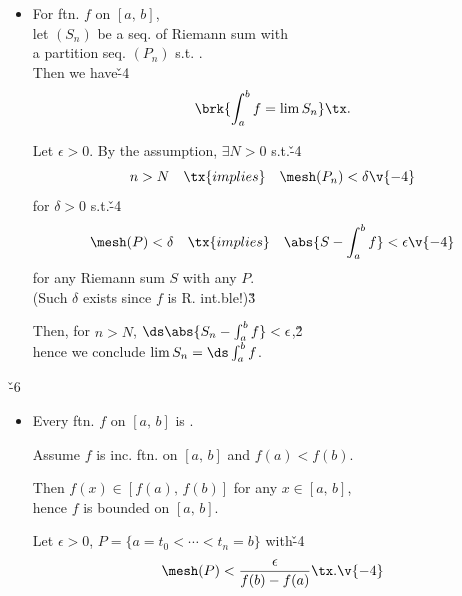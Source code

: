 \documentclass[dvipdfmx,a4paper,titlepage,9pt]{jsarticle}
\begin{document}
\begin{multicols*}{2}
\begin{itemize}[label={-}]
\begin{Pfbox}[($\Longto$)]
It follows that\v{-2}
$$\begin{aligned}
L(f)\lqs L(f,\,P)&>S-\epsilon(b-a)\\
&>r-\epsilon(b-a+1)\gqs r
\end{aligned}\v{-4}$$
since $\epsilon$ is arbitrary.

Similarly, we can show $U(f)\lqs r$.\v3

Since $L(f)\lqs U(f)$, we have $L(f)=U(f)=r$,\v2\\
hence $f$ is [D.] integrable, and $\ds\int_a^bf=\mcl R\int_a^bf$.
\end{Pfbox}\v9

\item For  ftn. $f$ on $[a,\,b]$,\\
let $(S_n)$ be a seq. of Riemann sum with\\
a partition seq. $(P_n)$ s.t. .\\
Then we have\v{-4}
$$\brk{\int_a^bf=\lim S_n}\tx.$$

\begin{Pfbox}
Let $\epsilon>0$. By the assumption, $\exists N>0$ s.t.\v{-4}
$$n>N\quad\tx{implies}\quad \mesh(P_n)<\delta\v{-4}$$
for $\delta>0$ s.t.\v{-4}
$$\mesh(P)<\delta\quad\tx{implies}\quad\abs{S-\int_a^bf}<\epsilon\v{-4}$$
for any Riemann sum $S$ with any $P$.\\
(Such $\delta$ exists since $f$ is R. int.ble!)\v3

Then, for $n>N$, $\ds\abs{S_n-\int_a^bf}<\epsilon$,\v2\\
hence we conclude $\lim S_n=\ds\int_a^bf$.
\end{Pfbox}
\end{itemize}

\newpage


\v{-6}
\begin{itemize}[label={-}]
\item Every  ftn. $f$ on $[a,\,b]$ is .

\begin{Pfbox}[(Increasing)]
Assume $f$ is inc. ftn. on $[a,\,b]$ and $f(a)<f(b)$.

Then $f(x)\in[f(a),\,f(b)]$ for any $x\in[a,\,b]$,\\
hence $f$ is bounded on $[a,\,b]$.

Let $\epsilon>0$, $P=\{a=t_0<\cdots<t_n=b\}$ with\v{-4}
$$\mesh(P)<\frac\epsilon{f(b)-f(a)}\tx.\v{-4}$$


\end{Pfbox}
\end{itemize}
\end{multicols*}
\end{document}
